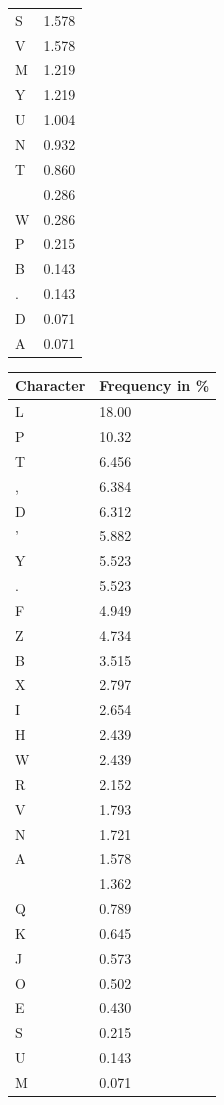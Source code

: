 \documentclass{uva-inf-presentation}
\begin{document}
\begin{frame}[containsverbatim]
\begin{minipage}{0.2\linewidth}
{\begin{tabular}{ll}
S & 1.578 \\
V & 1.578 \\
M & 1.219 \\
Y & 1.219 \\
U & 1.004 \\
N & 0.932 \\
T & 0.860 \\
  & 0.286 \\
W & 0.286 \\
P & 0.215 \\
B & 0.143 \\
. & 0.143 \\
D & 0.071 \\
A & 0.071 \\ \bottomrule
\end{tabular}}
\end{minipage}%
\begin{minipage}{0.2\linewidth}
\centering
{\fontsize{3.5pt}{4.5pt}\selectfont
\begin{tabular}{ll}\toprule
Character & Frequency in \%     \\
\midrule
L & 18.00 \\
P & 10.32 \\
T & 6.456 \\
, & 6.384 \\
D & 6.312 \\
' & 5.882 \\
Y & 5.523 \\
. & 5.523 \\
F & 4.949 \\
Z & 4.734 \\
B & 3.515 \\
X & 2.797 \\
I & 2.654 \\
H & 2.439 \\
W & 2.439 \\
R & 2.152 \\
V & 1.793 \\
N & 1.721 \\
A & 1.578 \\
  & 1.362 \\
Q & 0.789 \\
K & 0.645 \\
J & 0.573 \\
O & 0.502 \\
E & 0.430 \\
S & 0.215 \\
U & 0.143 \\
M & 0.071 \\

\end{tabular}}
\end{minipage}
\end{frame}
\end{document}
